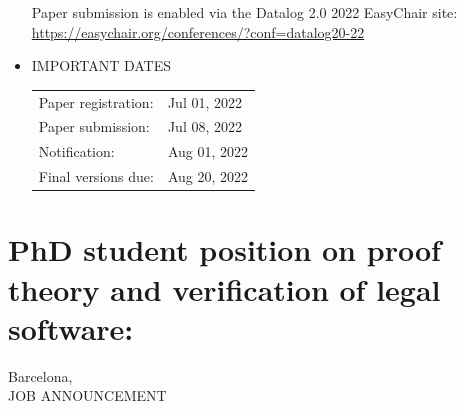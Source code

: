 \documentclass[prodmode,acmtecs]{acmsmall} %
\begin{document}
\begin{itemize}
  Paper submission is enabled via the Datalog 2.0 2022 EasyChair site: \href{https://easychair.org/conferences/?conf=datalog20-22}{https://easychair.org/conferences/?conf=datalog20-22}  
 
\item  IMPORTANT DATES 
 
\begin{tabulary}{\linewidth}{LL}Paper registration:  & Jul 01, 2022 \\
Paper submission:  & Jul 08, 2022 \\
Notification:  & Aug 01, 2022 \\
Final versions due:  & Aug 20, 2022 \\
\end{tabulary}
 
\end{itemize}\section{PhD student position on proof theory and verification of legal software:}\label{PhDstudentpositiononprooftheoryandverificationoflegalsoftware}  Barcelona, \\ 
JOB ANNOUNCEMENT 
\end{document}
